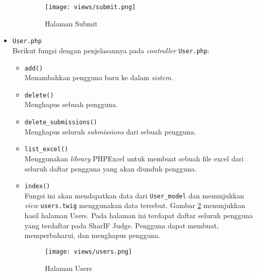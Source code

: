\begin{itemize}
\begin{itemize}
		            \begin{figure}
			            \centering
			            \texttt{[image: views/submit.png]}
			            \caption{Halaman Submit}
			            \label{fig:3:1:1:submit}
		            \end{figure}

	      \end{itemize}

	\item \verb|User.php| \\
	      Berikut fungsi dengan penjelasannya pada \textit{controller} \verb|User.php|:

	      \begin{itemize}
		      \item \verb|add()| \\
		            Menambahkan pengguna baru ke dalam \textit{sistem}.
		      \item \verb|delete()| \\
		            Menghapus sebuah pengguna.
		      \item \verb|delete_submissions()| \\
		            Menghapus seluruh \textit{submissions} dari sebuah pengguna.
		      \item \verb|list_excel()| \\
		            Menggunakan \textit{library} PHPExcel untuk membuat sebuah file excel dari seluruh daftar pengguna yang akan diunduh pengguna.
		      \item \verb|index()| \\
		            Fungsi ini akan mendapatkan data dari \verb|User_model| dan menunjukkan \textit{view} \verb|users.twig| menggunakan data tersebut. Gambar \ref{fig:3:1:1:users} menunjukkan hasil halaman Users. Pada halaman ini terdapat daftar seluruh pengguna yang terdaftar pada SharIF Judge. Pengguna dapat membuat, memperbaharui, dan menghapus pengguna.

		            \begin{figure}[H]
			            \centering
			            \texttt{[image: views/users.png]}
			            \caption{Halaman Users}
			            \label{fig:3:1:1:users}
		            \end{figure}


	      \end{itemize}

\end{itemize}

